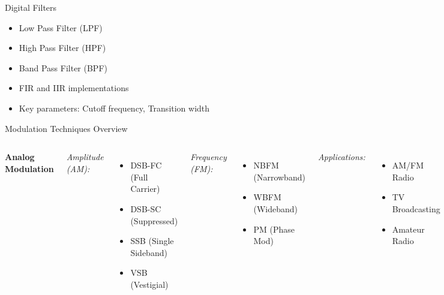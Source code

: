 \documentclass[aspectratio=169,11pt]{beamer}
\begin{document}
\begin{frame}{Digital Filters}
\begin{itemize}
    \item Low Pass Filter (LPF)
    \item High Pass Filter (HPF)
    \item Band Pass Filter (BPF)
    \item FIR and IIR implementations
    \item Key parameters: Cutoff frequency, Transition width
\end{itemize}
\end{frame}

\begin{frame}{Modulation Techniques Overview}
\footnotesize
\begin{columns}[T]
\textbf{\color{blue}Analog Modulation}

\textit{Amplitude (AM):}
\begin{itemize}
\small
    \item DSB-FC (Full Carrier)
    \item DSB-SC (Suppressed)
    \item SSB (Single Sideband)
    \item VSB (Vestigial)
\end{itemize}

\textit{Frequency (FM):}
\begin{itemize}
\small
    \item NBFM (Narrowband)
    \item WBFM (Wideband)
    \item PM (Phase Mod)
\end{itemize}

\textit{Applications:}
\begin{itemize}
\small
    \item AM/FM Radio
    \item TV Broadcasting
    \item Amateur Radio
\end{itemize}

\textbf{\color{blue}Digital Modulation}

\textit{Amplitude Shift:}
\begin{itemize}
\small
    \item OOK (On-Off Keying)
    \item ASK (Amplitude Shift)
    \item PAM (Pulse Amplitude)
\end{itemize}


\end{columns}
\end{frame}
\end{document}
